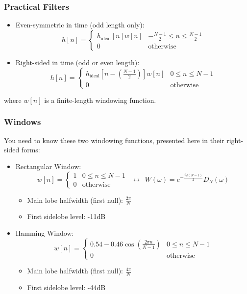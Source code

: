 \documentclass{beamer}
\begin{document}
\begin{frame}
  \frametitle{Practical Filters}
  \begin{itemize}
  \item Even-symmetric in time (odd length only):
    \[
    h[n] = \begin{cases}
      h_{\mbox{ideal}}[n]w[n] & -\frac{N-1}{2}\le n\le \frac{N-1}{2}\\
      0 & \mbox{otherwise}
    \end{cases}
    \]
  \item Right-sided in time (odd or even length):
    \[
    h[n] = \begin{cases}
      h_{\mbox{ideal}}\left[n-\left(\frac{N-1}{2}\right)\right]w[n] & 0\le n\le N-1\\
      0 & \mbox{otherwise}
    \end{cases}
    \]
  \end{itemize}
  where $w[n]$ is a finite-length windowing function.
\end{frame}

\begin{frame}
  \frametitle{Windows}

  You need to know these two windowing functions, presented here in
  their right-sided forms:
  \begin{itemize}
  \item Rectangular Window:
    \begin{displaymath}
      w[n]=\begin{cases}1&0\le n\le N-1\\0&\mbox{otherwise}\end{cases}~~\leftrightarrow~~
      W(\omega) = e^{-\frac{j\omega (N-1)}{2}}D_N(\omega)
    \end{displaymath}
    \begin{itemize}
    \item Main lobe halfwidth (first null): $\frac{2\pi}{N}$
    \item First sidelobe level: -11dB
    \end{itemize}
  \item Hamming Window:
    \begin{displaymath}
      w[n]=\begin{cases}
      0.54-0.46\cos\left(\frac{2\pi n}{N-1}\right)&0\le n\le N-1\\0&\mbox{otherwise}
      \end{cases}
    \end{displaymath}
    \begin{itemize}
    \item Main lobe halfwidth (first null): $\frac{4\pi}{N}$
    \item First sidelobe level: -44dB
    \end{itemize}
  \end{itemize}
\end{frame}
\end{document}
